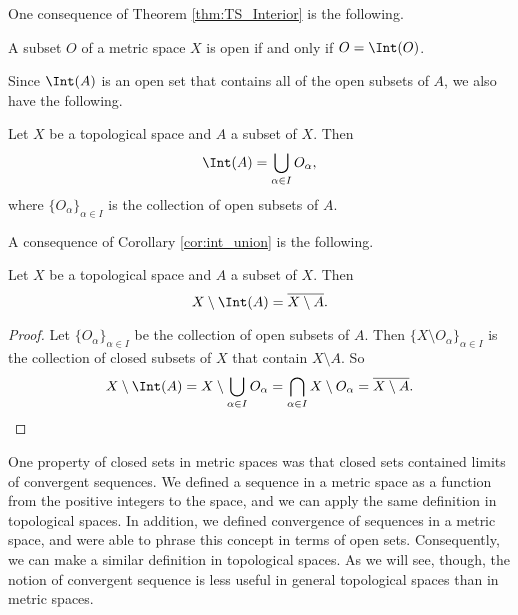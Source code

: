 One consequence of Theorem \ref{thm:TS_Interior} is the following.



\begin{corollary} A subset $O$ of a metric space $X$ is open if and only if $O = \Int(O)$. 
\end{corollary}
 


Since $\Int(A)$ is an open set that contains all of the open subsets of $A$, we also have the following.



\begin{corollary} \label{cor:int_union} Let $X$ be a topological space and $A$ a subset of $X$. Then 
\[\Int(A) = \bigcup_{\alpha \in I} O_{\alpha},\]
where $\{O_{\alpha}\}_{\alpha \in I}$ is the collection of open subsets of $A$. 
\end{corollary}



A consequence of Corollary \ref{cor:int_union} is the following.



\begin{corollary} Let $X$ be a topological space and $A$ a subset of $X$. Then
\[X \setminus \Int(A) = \overline{X \setminus A}.\]
\end{corollary}

\begin{proof} Let $\{O_{\alpha}\}_{\alpha \in I}$ be the collection of open subsets of $A$. Then $\{X \setminus O_{\alpha}\}_{\alpha \in I}$ is the collection of closed subsets of $X$ that contain $X \setminus A$. So
\[X \setminus \Int(A) = X \setminus \bigcup_{\alpha \in I} O_{\alpha} = \bigcap_{\alpha \in I} X \setminus O_{\alpha} = \overline{X \setminus A}.\]
\end{proof}   





One property of closed sets in metric spaces was that closed sets contained limits of convergent sequences. We defined a sequence in a metric space as a function from the positive integers to the space, and we can apply the same definition in topological spaces. In addition, we defined convergence of sequences in a metric space, and were able to phrase this concept in terms of open sets. Consequently, we can make a similar definition in topological spaces. As we will see, though, the notion of convergent sequence is less useful in general topological spaces than in metric spaces. 



